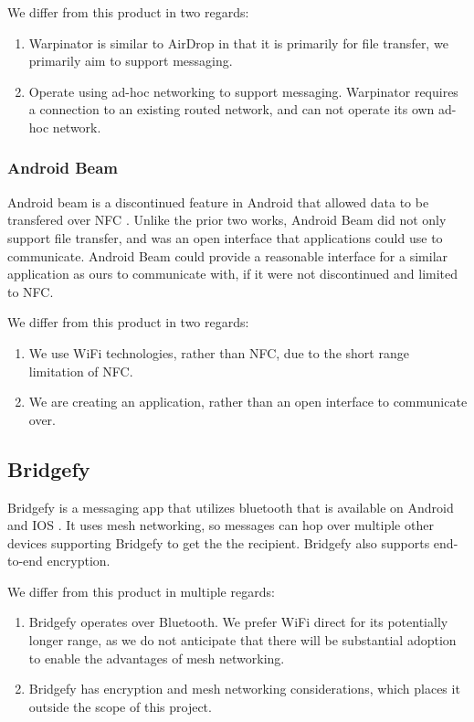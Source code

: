 \documentclass[10pt]{article}
\begin{document}
We differ from this product in two regards:

\begin{enumerate}
    \item Warpinator is similar to AirDrop in that it is primarily for file transfer, we primarily aim to support messaging.
    \item Operate using ad-hoc networking to support messaging. Warpinator requires a connection to an existing routed network, and can not operate its own ad-hoc network.
\end{enumerate}

\subsubsection{Android Beam}

Android beam is a discontinued \cite{Cantisano_2022} feature in Android that allowed data to be transfered over NFC \cite{AndroidDevelopers}. Unlike the prior two works, Android Beam did not only support file transfer, and was an open interface that applications could use to communicate. Android Beam could provide a reasonable interface for a similar application as ours to communicate with, if it were not discontinued and limited to NFC.

We differ from this product in two regards:

\begin{enumerate}
    \item We use WiFi technologies, rather than NFC, due to the short range limitation of NFC.
    \item We are creating an application, rather than an open interface to communicate over.
\end{enumerate}

\subsection{Bridgefy}

Bridgefy is a messaging app that utilizes bluetooth that is available on Android and IOS \cite{Bridgefy}. It uses mesh networking, so messages can hop over multiple other devices supporting Bridgefy to get the the recipient. Bridgefy also supports end-to-end encryption.

We differ from this product in multiple regards:

\begin{enumerate}
    \item Bridgefy operates over Bluetooth. We prefer WiFi direct for its potentially longer range, as we do not anticipate that there will be substantial adoption to enable the advantages of mesh networking.
    \item Bridgefy has encryption and mesh networking considerations, which places it outside the scope of this project.
\end{enumerate}
\end{document}
